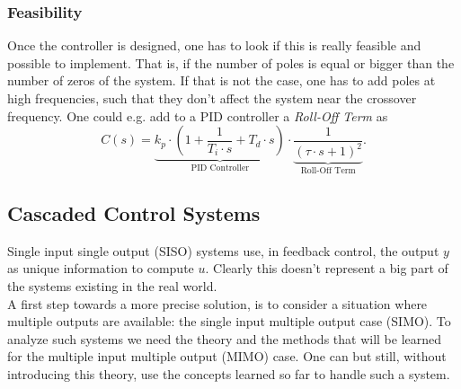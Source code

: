 \documentclass[a4paper,12 pt]{article}
\numberwithin{equation}{section}
\theoremstyle{definition}
\theoremstyle{remark}
\theoremstyle{definition}
\theoremstyle{definition}
\theoremstyle{definition}
\theoremstyle{remark}
\begin{document}
\subsubsection{Feasibility}
Once the controller is designed, one has to look if this is really feasible and possible to implement. That is, if the number of poles is equal or bigger than the number of zeros of the system. If that is not the case, one has to add poles at high frequencies, such that they don't affect the system near the crossover frequency. One could e.g. add to a PID controller a \textit{Roll-Off Term} as
\begin{equation}
C(s)=\underbrace{k_p\cdot \left(1+\frac{1}{T_i \cdot s}+T_d\cdot s \right)}_{\text{PID Controller}}\cdot \underbrace{\frac{1}{(\tau \cdot s+1)^2}}_{\text{Roll-Off Term}}.
\end{equation}


\newpage

\subsection{Cascaded Control Systems}


Single input single output (SISO) systems use, in feedback control, the output $y$ as unique information to compute $u$. Clearly this doesn't represent a big part of the systems existing in the real world. \\
A first step towards a more precise solution, is to consider a situation where multiple outputs are available: the single input multiple output case (SIMO). To analyze such systems we need the theory and the methods that will be learned for the multiple input multiple output (MIMO) case. One can but still, without introducing this theory, use the concepts learned so far to handle such a system.
\end{document}
